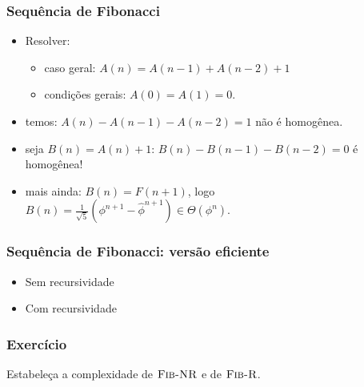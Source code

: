 \documentclass[handout]{beamer}
\begin{document}
\begin{frame}
\frametitle{Sequência de Fibonacci}

\begin{itemize}
\item Resolver:
\begin{itemize}
\item caso geral: $A(n) = A(n-1) + A(n-2) + 1$
\item condições gerais: $A(0) = A(1) = 0$.
\end{itemize}
\item temos: $A(n) - A(n-1) - A(n-2) = 1$ não é homogênea.
\item seja $B(n) = A(n)+1$: $B(n) - B(n-1) - B(n-2) = 0$ é homogênea!
\item mais ainda: $B(n) = F(n+1)$, logo $B(n) = \frac{1}{\sqrt{5}}(\phi^{n+1} - \hat{\phi}^{n+1}) \in \Theta(\phi^n)$.
\end{itemize}

\end{frame}

\begin{frame}
\frametitle{Sequência de Fibonacci: versão eficiente}

\begin{itemize}
\item Sem recursividade

\item Com recursividade

\end{itemize}

\end{frame}

\begin{frame}
\frametitle{Exercício}

Estabeleça a complexidade de $\textnormal{\scshape Fib-NR}$ e de $\textnormal{\scshape Fib-R}$.

\end{frame}
\end{document}
